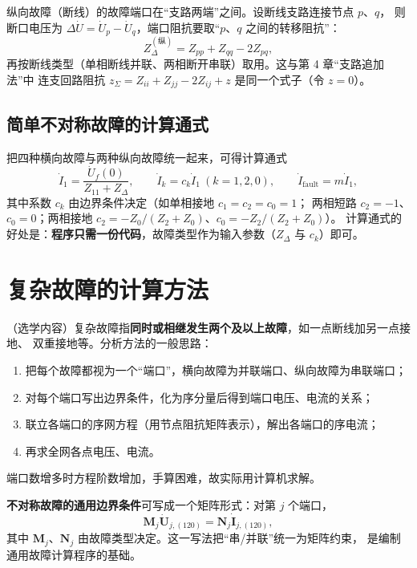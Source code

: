 纵向故障（断线）的故障端口在“支路两端”之间。设断线支路连接节点 $p$、$q$，
则断口电压为 $\Delta\dot U=\dot U_p-\dot U_q$，端口阻抗要取“$p$、$q$ 之间的转移阻抗”：
\begin{equation}
  Z_{\Delta}^{(\text{纵})}=Z_{pp}+Z_{qq}-2Z_{pq},
\end{equation}
再按断线类型（单相断线并联、两相断开串联）取用。这与第 4 章“支路追加法”中
连支回路阻抗 $z_\Sigma=Z_{ii}+Z_{jj}-2Z_{ij}+z$ 是同一个式子（令 $z=0$）。

\subsection{简单不对称故障的计算通式}

把四种横向故障与两种纵向故障统一起来，可得计算通式
\begin{equation}
  \dot I_1=\frac{\dot U_f(0)}{Z_{11}+Z_{\Delta}},\qquad
  \dot I_k=c_k\dot I_1\ (k=1,2,0),\qquad
  \dot I_{\text{fault}}=m\dot I_1 ,
\end{equation}
其中系数 $c_k$ 由边界条件决定（如单相接地 $c_1=c_2=c_0=1$；
两相短路 $c_2=-1$、$c_0=0$；两相接地 $c_2=-Z_0/(Z_2+Z_0)$、$c_0=-Z_2/(Z_2+Z_0)$）。
计算通式的好处是：\textbf{程序只需一份代码}，故障类型作为输入参数（$Z_\Delta$ 与 $c_k$）即可。

\section{复杂故障的计算方法}

（选学内容）复杂故障指\textbf{同时或相继发生两个及以上故障}，如一点断线加另一点接地、
双重接地等。分析方法的一般思路：
\begin{enumerate}
  \item 把每个故障都视为一个“端口”，横向故障为并联端口、纵向故障为串联端口；
  \item 对每个端口写出边界条件，化为序分量后得到端口电压、电流的关系；
  \item 联立各端口的序网方程（用节点阻抗矩阵表示），解出各端口的序电流；
  \item 再求全网各点电压、电流。
\end{enumerate}
端口数增多时方程阶数增加，手算困难，故实际用计算机求解。

\textbf{不对称故障的通用边界条件}可写成一个矩阵形式：对第 $j$ 个端口，
\begin{equation}
  \boldsymbol M_j\dot{\boldsymbol U}_{j,(120)}=\boldsymbol N_j\dot{\boldsymbol I}_{j,(120)},
\end{equation}
其中 $\boldsymbol M_j$、$\boldsymbol N_j$ 由故障类型决定。这一写法把“串/并联”统一为矩阵约束，
是编制通用故障计算程序的基础。

